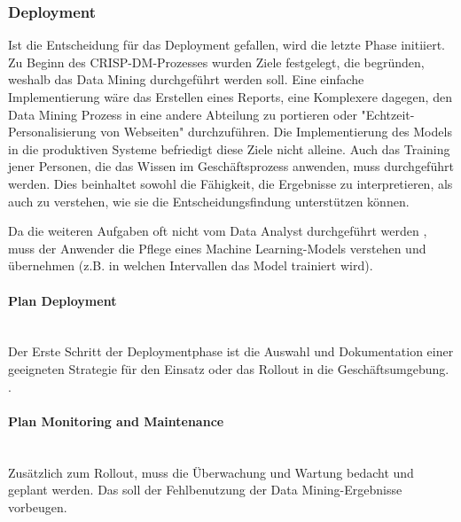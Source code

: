 \subsubsection{Deployment}
Ist die Entscheidung für das Deployment gefallen, wird die letzte Phase initiiert. Zu Beginn des CRISP-DM-Prozesses wurden Ziele festgelegt, die begründen, weshalb das Data Mining durchgeführt werden soll. 
Eine einfache Implementierung wäre das Erstellen eines Reports, eine Komplexere dagegen, den Data Mining Prozess in eine andere Abteilung zu portieren\citep[Punkte 1.4.1.6.b und c]{larose_discovering_2014} oder "Echtzeit-Personalisierung von Webseiten"\citep[S.~18; eigene Übersetzung]{shearer_crisp-dm_2000} durchzuführen.\newline
Die Implementierung des Models in die produktiven Systeme befriedigt diese Ziele nicht alleine. Auch das Training jener Personen, die das Wissen im Geschäftsprozess anwenden, muss durchgeführt werden. Dies beinhaltet sowohl die Fähigkeit, die Ergebnisse zu interpretieren, als auch zu verstehen, wie sie die Entscheidungsfindung unterstützen können.\citep[S.~73]{swamynathan_mastering_2017} \newline

Da die weiteren Aufgaben oft nicht vom Data Analyst durchgeführt werden \citep[Punkt 1.4.1.6.d]{larose_discovering_2014}, muss der Anwender die Pflege eines Machine Learning-Models verstehen und übernehmen (z.B. in welchen Intervallen das Model trainiert wird).\citep[S.~74]{swamynathan_mastering_2017}

\paragraph{Plan Deployment}\mbox{} \\
Der Erste Schritt  der Deploymentphase ist die Auswahl und Dokumentation einer geeigneten Strategie für den Einsatz oder das Rollout in die Geschäftsumgebung. . 

\paragraph{Plan Monitoring and Maintenance}\mbox{} \\
Zusätzlich zum Rollout, muss die Überwachung und Wartung bedacht und geplant werden. Das soll der Fehlbenutzung der Data Mining-Ergebnisse vorbeugen.


